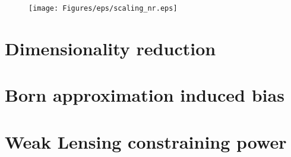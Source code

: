 %
\begin{figure}
\begin{center}
\texttt{[image: Figures/eps/scaling\_nr.eps]}
\end{center}
\caption{}
\label{fig:5:pseudonr}
\end{figure}


\section{Dimensionality reduction}

\section{Born approximation induced bias}

\section{Weak Lensing constraining power}

